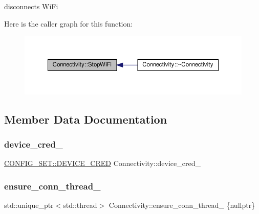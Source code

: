 disconnects Wi\+Fi 

Here is the caller graph for this function\+:
\nopagebreak
\begin{figure}[H]
\begin{center}
\leavevmode
\includegraphics[width=350pt]{classConnectivity_a5c562f136d52c4a91eedba957e68b71e_icgraph}
\end{center}
\end{figure}


\subsection{Member Data Documentation}
\mbox{\label{classConnectivity_abed78a2ba39529d90841f555a81ef04a}} 
\subsubsection{\texorpdfstring{device\+\_\+cred\+\_\+}{device\_cred\_}}
{\footnotesize\ttfamily \hyperlink{structCONFIG__SET_1_1DEVICE__CRED}{C\+O\+N\+F\+I\+G\+\_\+\+S\+E\+T\+::\+D\+E\+V\+I\+C\+E\+\_\+\+C\+R\+ED} Connectivity\+::device\+\_\+cred\+\_\+\hspace{0.3cm}{\ttfamily [private]}}

\mbox{\label{classConnectivity_afb016a3f11d6d59e9e6feb3869ea5329}} 
\subsubsection{\texorpdfstring{ensure\+\_\+conn\+\_\+thread\+\_\+}{ensure\_conn\_thread\_}}
{\footnotesize\ttfamily std\+::unique\+\_\+ptr$<$std\+::thread$>$ Connectivity\+::ensure\+\_\+conn\+\_\+thread\+\_\+ \{nullptr\}\hspace{0.3cm}{\ttfamily [private]}}

